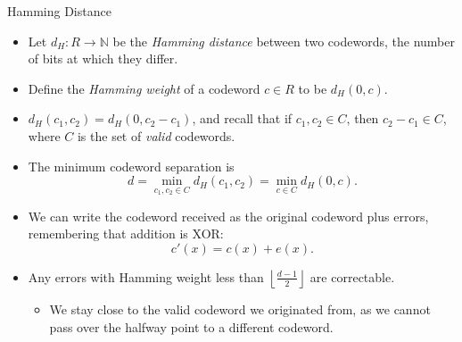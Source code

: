 \documentclass[handout]{beamer}
\begin{document}
\begin{frame}{Hamming Distance}
    \begin{itemize}
        \item Let $d_H : R \to \mathbb N$ be the \emph{Hamming distance} between two codewords, the number of bits at which they differ.
        \item Define the \emph{Hamming weight} of a codeword $c \in R$ to be $d_H(0, c)$.
        \item $d_H(c_1,c_2)=d_H(0,c_2-c_1)$, and recall that if $c_1,c_2 \in C$, then $c_2-c_1 \in C$, where $C$ is the set of \emph{valid} codewords.
        \item The minimum codeword separation is
            \[d = \min_{c_1,c_2 \in C} d_H(c_1,c_2) = \min_{c \in C} d_H(0,c).\]
        \item We can write the codeword received as the original codeword plus errors, remembering that addition is XOR: \[c'(x) = c(x) + e(x).\]
        \item Any errors with Hamming weight less than
        $\left\lfloor \frac{d-1}{2} \right\rfloor$
        are correctable.
        \begin{itemize}
            \item We stay close to the valid codeword we originated from, as we cannot pass over the halfway point to a different codeword.
        \end{itemize}
    \end{itemize}
\end{frame}
\end{document}
